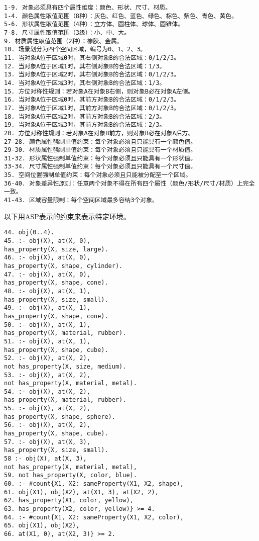 \begin{lstlisting}
1-9. 对象必须具有四个属性维度：颜色、形状、尺寸、材质。
1-4. 颜色属性取值范围（8种）：灰色、红色、蓝色、绿色、棕色、紫色、青色、黄色。
5-6. 形状属性取值范围（4种）：立方体、圆柱体、球体、圆锥体。
7-8. 尺寸属性取值范围（3级）：小、中、大。
9. 材质属性取值范围（2种）：橡胶、金属。
10. 场景划分为四个空间区域，编号为0、1、2、3。
11. 当对象A位于区域0时，其右侧对象B的合法区域：0/1/2/3。
12. 当对象A位于区域1时，其右侧对象B的合法区域：1/3。
13. 当对象A位于区域2时，其右侧对象B的合法区域：0/1/2/3。
14. 当对象A位于区域3时，其右侧对象B的合法区域：1/3。
15. 方位对称性规则：若对象A在对象B右侧，则对象B必在对象A左侧。
16. 当对象A位于区域0时，其前方对象B的合法区域：0/1/2/3。
17. 当对象A位于区域1时，其前方对象B的合法区域：0/1/2/3。
18. 当对象A位于区域2时，其前方对象B的合法区域：2/3。
19. 当对象A位于区域3时，其前方对象B的合法区域：2/3。
20. 方位对称性规则：若对象A在对象B前方，则对象B必在对象A后方。
27-28. 颜色属性强制单值约束：每个对象必须且只能具有一个颜色值。
29-30. 材质属性强制单值约束：每个对象必须且只能具有一个材质值。
31-32. 形状属性强制单值约束：每个对象必须且只能具有一个形状值。
33-34. 尺寸属性强制单值约束：每个对象必须且只能具有一个尺寸值。
35. 空间位置强制单值约束：每个对象必须且只能被分配至一个区域。
36-40. 对象差异性原则：任意两个对象不得在所有四个属性（颜色/形状/尺寸/材质）上完全一致。
41-43. 区域容量限制：每个空间区域最多容纳3个对象。
\end{lstlisting}
以下用ASP表示的约束来表示特定环境。
\begin{lstlisting}
44. obj(0..4).
45. :- obj(X), at(X, 0),
has_property(X, size, large).
46. :- obj(X), at(X, 0),
has_property(X, shape, cylinder).
47. :- obj(X), at(X, 0),
has_property(X, shape, cone).
48. :- obj(X), at(X, 1),
has_property(X, size, small).
49. :- obj(X), at(X, 1),
has_property(X, shape, cone).
50. :- obj(X), at(X, 1),
has_property(X, material, rubber).
51. :- obj(X), at(X, 1),
has_property(X, shape, cube).
52. :- obj(X), at(X, 2),
not has_property(X, size, medium).
53. :- obj(X), at(X, 2),
not has_property(X, material, metal).
54. :- obj(X), at(X, 2),
has_property(X, material, rubber).
55. :- obj(X), at(X, 2),
has_property(X, shape, sphere).
56. :- obj(X), at(X, 2),
has_property(X, shape, cube).
57. :- obj(X), at(X, 3),
has_property(X, size, small).
58 :- obj(X), at(X, 3),
not has_property(X, material, metal),
59. not has_property(X, color, blue).
60. :- #count{X1, X2: sameProperty(X1, X2, shape),
61. obj(X1), obj(X2), at(X1, 3), at(X2, 2),
62. has_property(X1, color, yellow),
63. has_property(X2, color, yellow)} >= 4.
64. :- #count{X1, X2: sameProperty(X1, X2, color),
65. obj(X1), obj(X2),
66. at(X1, 0), at(X2, 3)} >= 2.
\end{lstlisting}
